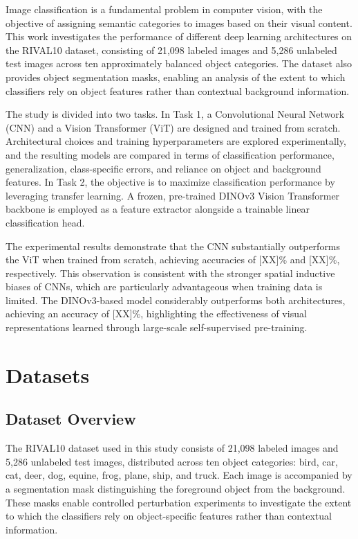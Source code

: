 \documentclass[conference]{IEEEtran}
\begin{document}
Image classification is a fundamental problem in computer vision, 
with the objective of assigning semantic categories to images 
based on their visual content. This work investigates the 
performance of different deep learning architectures on the 
RIVAL10 dataset, consisting of 21,098 labeled images and 5,286 
unlabeled test images across ten approximately balanced object 
categories. The dataset also provides object segmentation masks, 
enabling an analysis of the extent to which classifiers rely on 
object features rather than contextual background information.

The study is divided into two tasks. In Task 1, a Convolutional 
Neural Network (CNN) and a Vision Transformer (ViT) are designed 
and trained from scratch. Architectural choices and training 
hyperparameters are explored experimentally, and the resulting 
models are compared in terms of classification performance, 
generalization, class-specific errors, and reliance on object 
and background features. In Task 2, the objective is to maximize 
classification performance by leveraging transfer learning. 
A frozen, pre-trained DINOv3 Vision Transformer backbone is 
employed as a feature extractor alongside a trainable linear 
classification head.

The experimental results demonstrate that the CNN substantially 
outperforms the ViT when trained from scratch, achieving 
accuracies of [XX]\% and [XX]\%, respectively. This observation 
is consistent with the stronger spatial inductive biases of 
CNNs, which are particularly advantageous when training data 
is limited. The DINOv3-based model considerably outperforms 
both architectures, achieving an accuracy of [XX]\%, 
highlighting the effectiveness of visual representations learned 
through large-scale self-supervised pre-training.



\section{Datasets}
\label{sec:datasets}

\subsection{Dataset Overview}

The RIVAL10 dataset used in this study consists of 21,098
labeled images and 5,286 unlabeled test images, distributed
across ten object categories: bird, car, cat, deer, dog,
equine, frog, plane, ship, and truck. Each image is
accompanied by a segmentation mask distinguishing the
foreground object from the background. These masks enable
controlled perturbation experiments to investigate the
extent to which the classifiers rely on object-specific
features rather than contextual information.
\end{document}
